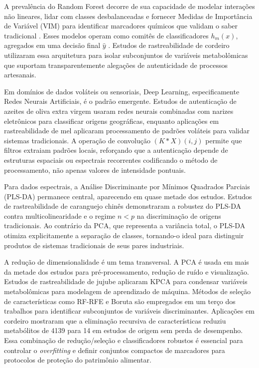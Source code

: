 A prevalência do Random Forest decorre de sua capacidade de modelar interações não lineares, lidar com classes desbalanceadas e fornecer Medidas de Importância de Variável (VIM) para identificar marcadores químicos que validam o saber tradicional  \cite{Zhang2025MRF}. Esses modelos operam como comitês de classificadores $h_m(x)$, agregados em uma decisão final $\hat{y}$  \cite{Cornelio2019VORACE}. Estudos de rastreabilidade de cordeiro utilizaram essa arquitetura para isolar subconjuntos de variáveis metabolômicas que suportam transparentemente alegações de autenticidade de processos artesanais.

Em domínios de dados voláteis ou sensoriais, Deep Learning, especificamente Redes Neurais Artificiais, é o padrão emergente. Estudos de autenticação de azeites de oliva extra virgem usaram redes neurais combinadas com narizes eletrônicos para classificar origens geográficas, enquanto aplicações em rastreabilidade de mel aplicaram processamento de padrões voláteis para validar sistemas tradicionais. A operação de convolução $(K * X)(i,j)$ permite que filtros extraiam padrões locais, reforçando que a autenticação depende de estruturas espaciais ou espectrais recorrentes codificando o método de processamento, não apenas valores de intensidade pontuais.

Para dados espectrais, a Análise Discriminante por Mínimos Quadrados Parciais (PLS-DA) permanece central, aparecendo em quase metade dos estudos. Estudos de rastreabilidade de caranguejo chinês demonstraram a robustez do PLS-DA contra multicolinearidade e o regime $n < p$ na discriminação de origens tradicionais. Ao contrário da PCA, que representa a variância total, o PLS-DA otimiza explicitamente a separação de classes, tornando-o ideal para distinguir produtos de sistemas tradicionais de seus pares industriais.

A redução de dimensionalidade é um tema transversal. A PCA é usada em mais da metade dos estudos para pré-processamento, redução de ruído e visualização. Estudos de rastreabilidade de jujube aplicaram KPCA para condensar variáveis metabolômicas para modelagem de aprendizado de máquina. Métodos de seleção de características como RF-RFE e Boruta são empregados em um terço dos trabalhos para identificar subconjuntos de variáveis discriminantes. Aplicações em cordeiro mostraram que a eliminação recursiva de características reduziu metabólitos de 4139 para 14 em estudos de origem sem perda de desempenho. Essa combinação de redução/seleção e classificadores robustos é essencial para controlar o \emph{overfitting} e definir conjuntos compactos de marcadores para protocolos de proteção do patrimônio alimentar.

